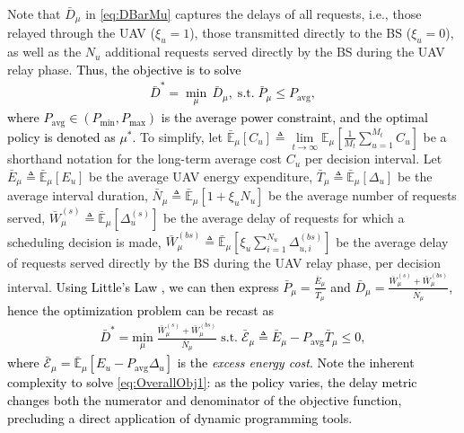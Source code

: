 \documentclass[12pt, draftcls, onecolumn]{IEEEtran}
\theoremstyle{plain}
\theoremstyle{definition}
\theoremstyle{remark}
\newcommand\hlt[1]{\textcolor{black}{#1}}
\begin{document}
Note that $\bar{D}_{\mu}$ in \eqref{eq:DBarMu} captures the delays of all requests, i.e., those relayed through the UAV ($\xi_{u}{=}1$), those transmitted directly to the BS ($\xi_{u}{=}0$), as well as the $N_{u}$ additional requests served directly by the BS during the UAV relay phase. \hlt{Thus, the objective is to solve 
\begin{align}\label{eq:opt_prob_orig}
    \bar D^* = \min_{\mu} \, \bar{D}_{\mu}, \; \mathrm{s.t.} \; \bar P_{\mu} \leq P_{\mathrm{avg}},
\end{align}
where $P_{\mathrm{avg}}\in(P_{\min},P_{\max})$ is the average power constraint,
and the optimal policy is denoted as $\mu^*$.} To simplify, let $\bar{\mathbb{E}}_{\mu}[C_{u}]{\triangleq}\lim\limits_{t{\rightarrow}\infty}\mathbb{E}_{\mu}[\frac{1}{M_{t}}\sum_{u{=}1}^{M_{t}}C_{u}]$ be a shorthand notation for the long-term average cost $C_u$ per decision interval. Let $\bar{E}_{\mu}{\triangleq}\bar{\mathbb{E}}_{\mu}\left[E_{u}\right]$ be the average UAV energy expenditure, $\bar{T}_{\mu}{\triangleq}\bar{\mathbb{E}}_{\mu}\left[\Delta_{u}\right]$ be the average interval duration, $\bar{N}_{\mu}{\triangleq}\bar{\mathbb{E}}_{\mu}[1+\xi_{u}N_{u}]$ be the average number of requests served, $\bar{W}_{\mu}^{(s)}{\triangleq}\bar{\mathbb{E}}_{\mu}[\Delta_{u}^{(s)}]$ be the average delay of requests for which a scheduling decision is made, $\bar{W}_{\mu}^{(bs)}{\triangleq}\bar{\mathbb{E}}_{\mu}[\xi_{u}\sum_{i{=}1}^{N_{u}}\Delta_{u,i}^{(bs)}]$ be the average delay of requests served directly by the BS during the UAV relay phase, per decision interval. \hlt{Using Little's Law \cite{LittlesLaw}, we  can then express $\bar{P}_{\mu}{=}\frac{\bar{E}_{\mu}}{\bar{T}_{\mu}}$ and $\bar{D}_{\mu}{=}\frac{\bar{W}_{\mu}^{(s)}+\bar{W}_{\mu}^{(bs)}}{\bar{N}_{\mu}}$, hence the optimization problem can be recast as
\begin{align}\label{eq:OverallObj1}
    \bar{D}^{*} = \underset{\mu}{\mathrm{min}} \; \frac{\bar{W}_{\mu}^{(s)} + \bar{W}_{\mu}^{(bs)}}{\bar{N}_{\mu}} \; \mathrm{s.t.} \; 
    \bar{\mathcal E}_\mu\triangleq
    \bar{E}_{\mu} - P_{\mathrm{avg}}\bar{T}_{\mu} \leq 0,
\end{align}
where $\bar{\mathcal E}_\mu{=}\bar{\mathbb{E}}_{\mu}[E_{u}{-}P_{\mathrm{avg}}\Delta_u]$ is the \emph{excess energy cost}.
Note the inherent complexity to solve \eqref{eq:OverallObj1}: as the policy varies, the delay metric changes both the numerator and denominator of the objective function, precluding a direct application of dynamic programming tools.}
\end{document}
